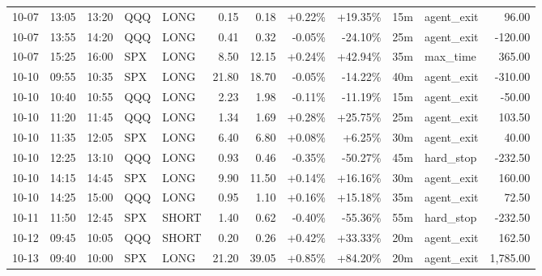 \documentclass[11pt,a4paper]{article}
\begin{document}
\begin{center}
\begin{longtable}{>{\color{txtmain}}l l l l l r r r r r >{\color{txtmain}}l r}
10-07 & 13:05 & 13:20 & QQQ & LONG & 0.15 & 0.18 & \textcolor{wingreen}{+0.22\%} & \textcolor{wingreen}{+19.35\%} & 15m & agent\_exit & \textcolor{wingreen}{96.00} \\
10-07 & 13:55 & 14:20 & QQQ & LONG & 0.41 & 0.32 & \textcolor{lossred}{-0.05\%} & \textcolor{lossred}{-24.10\%} & 25m & agent\_exit & \textcolor{lossred}{-120.00} \\
10-07 & 15:25 & 16:00 & SPX & LONG & 8.50 & 12.15 & \textcolor{wingreen}{+0.24\%} & \textcolor{wingreen}{+42.94\%} & 35m & max\_time & \textcolor{wingreen}{365.00} \\
10-10 & 09:55 & 10:35 & SPX & LONG & 21.80 & 18.70 & \textcolor{lossred}{-0.05\%} & \textcolor{lossred}{-14.22\%} & 40m & agent\_exit & \textcolor{lossred}{-310.00} \\
10-10 & 10:40 & 10:55 & QQQ & LONG & 2.23 & 1.98 & \textcolor{lossred}{-0.11\%} & \textcolor{lossred}{-11.19\%} & 15m & agent\_exit & \textcolor{lossred}{-50.00} \\
10-10 & 11:20 & 11:45 & QQQ & LONG & 1.34 & 1.69 & \textcolor{wingreen}{+0.28\%} & \textcolor{wingreen}{+25.75\%} & 25m & agent\_exit & \textcolor{wingreen}{103.50} \\
10-10 & 11:35 & 12:05 & SPX & LONG & 6.40 & 6.80 & \textcolor{wingreen}{+0.08\%} & \textcolor{wingreen}{+6.25\%} & 30m & agent\_exit & \textcolor{wingreen}{40.00} \\
10-10 & 12:25 & 13:10 & QQQ & LONG & 0.93 & 0.46 & \textcolor{lossred}{-0.35\%} & \textcolor{lossred}{-50.27\%} & 45m & hard\_stop & \textcolor{lossred}{-232.50} \\
10-10 & 14:15 & 14:45 & SPX & LONG & 9.90 & 11.50 & \textcolor{wingreen}{+0.14\%} & \textcolor{wingreen}{+16.16\%} & 30m & agent\_exit & \textcolor{wingreen}{160.00} \\
10-10 & 14:25 & 15:00 & QQQ & LONG & 0.95 & 1.10 & \textcolor{wingreen}{+0.16\%} & \textcolor{wingreen}{+15.18\%} & 35m & agent\_exit & \textcolor{wingreen}{72.50} \\
10-11 & 11:50 & 12:45 & SPX & SHORT & 1.40 & 0.62 & \textcolor{lossred}{-0.40\%} & \textcolor{lossred}{-55.36\%} & 55m & hard\_stop & \textcolor{lossred}{-232.50} \\
10-12 & 09:45 & 10:05 & QQQ & SHORT & 0.20 & 0.26 & \textcolor{wingreen}{+0.42\%} & \textcolor{wingreen}{+33.33\%} & 20m & agent\_exit & \textcolor{wingreen}{162.50} \\
10-13 & 09:40 & 10:00 & SPX & LONG & 21.20 & 39.05 & \textcolor{wingreen}{+0.85\%} & \textcolor{wingreen}{+84.20\%} & 20m & agent\_exit & \textcolor{wingreen}{1,785.00} \\

\end{longtable}
\end{center}
\end{document}

